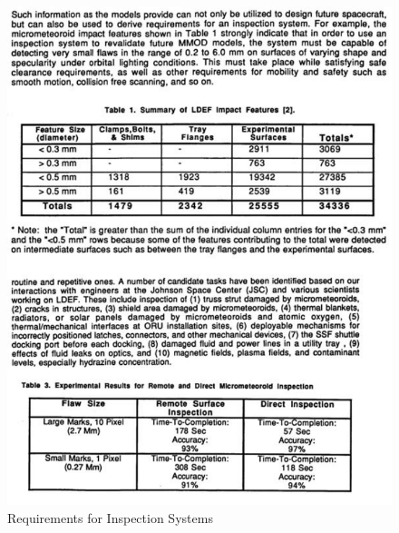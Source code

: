 \documentclass[12pt, letterpaper]{article}
\begin{document}
\begin{figure}[H]
\centering
\includegraphics[scale=1]{Apppic/inspect}
\caption[Requirements for Inspection Systems]{Requirements for Inspection Systems \cite{NASAinspect_Hayati}}
\end{figure}
\end{document}
